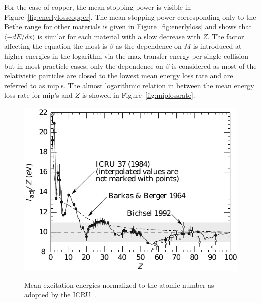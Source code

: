 	For the case of copper, the mean stopping power is visible in Figure~\ref{fig:enerlylosscopper}. The mean stopping power corresponding only to the Bethe range for other materials is given in Figure~\ref{fig:enerlyloss} and shows that $\langle-dE/dx\rangle$ is similar for each material with a slow decrease with $Z$. The factor affecting the equation the most is $\beta$ as the dependence on $M$ is introduced at higher energies in the logarithm via the max transfer energy per single collision but in most practicle cases, only the dependence on $\beta$ is considered as most of the relativistic particles are closed to the lowest mean energy loss rate and are referred to as \acf{mip's}. The almost logarithmic relation in between the mean energy loss rate for \acl{mip's} and $Z$ is showed in Figure~\ref{fig:miplossrate}.
	
	\begin{figure}[H]
		\centering
		\includegraphics[width = 0.8\plotwidth]{fig/chapt4/Iadj_pegs_adndt.pdf}\\
		\caption{\label{fig:excitationenergy} Mean excitation energies normalized to the atomic number as adopted by the ICRU~\cite{ICRU37,ICRU49,PDG2016}.}
	\end{figure}
	
